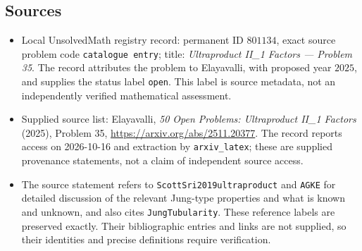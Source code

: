 \documentclass[11pt]{article}
\begin{document}
\subsection{Sources}
\begin{itemize}
\item Local UnsolvedMath registry record: permanent ID \(801134\), exact source problem code \texttt{catalogue entry}; title: \emph{Ultraproduct II\_1 Factors --- Problem 35}. The record attributes the problem to Elayavalli, with proposed year \(2025\), and supplies the status label \texttt{open}. This label is source metadata, not an independently verified mathematical assessment.
\item Supplied source list: Elayavalli, \emph{50 Open Problems: Ultraproduct II\_1 Factors} (2025), Problem 35, \url{https://arxiv.org/abs/2511.20377}. The record reports access on 2026-10-16 and extraction by \texttt{arxiv\_latex}; these are supplied provenance statements, not a claim of independent source access.
\item The source statement refers to \texttt{ScottSri2019ultraproduct} and \texttt{AGKE} for detailed discussion of the relevant Jung-type properties and what is known and unknown, and also cites \texttt{JungTubularity}. These reference labels are preserved exactly. Their bibliographic entries and links are not supplied, so their identities and precise definitions require verification.
\end{itemize}
\end{document}
